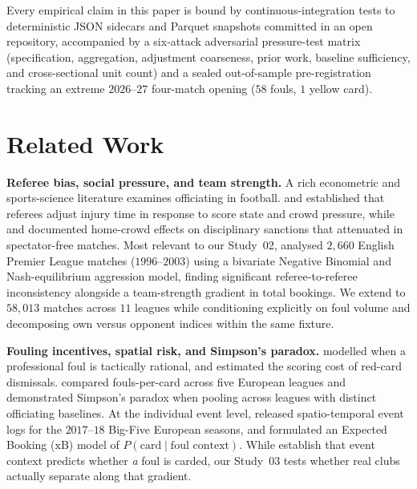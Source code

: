 \documentclass[10pt,twocolumn]{article}
\begin{document}
Every empirical claim in this paper is bound by continuous-integration tests to deterministic JSON sidecars and Parquet snapshots committed in an open repository, accompanied by a six-attack adversarial pressure-test matrix (specification, aggregation, adjustment coarseness, prior work, baseline sufficiency, and cross-sectional unit count) and a sealed out-of-sample pre-registration tracking an extreme $2026\text{--}27$ four-match opening ($58$ fouls, $1$ yellow card).

\section{Related Work}

\textbf{Referee bias, social pressure, and team strength.} A rich econometric and sports-science literature examines officiating in football. \citet{garicano2005favoritism} and \citet{dohmen2008social} established that referees adjust injury time in response to score state and crowd pressure, while \citet{boyko2007referee} and \citet{sors2021silence} documented home-crowd effects on disciplinary sanctions that attenuated in spectator-free matches. Most relevant to our Study~02, \citet{dawson2007referees} analysed $2,660$ English Premier League matches ($1996\text{--}2003$) using a bivariate Negative Binomial and Nash-equilibrium aggression model, finding significant referee-to-referee inconsistency alongside a team-strength gradient in total bookings. We extend \citet{dawson2007referees} to $58,013$ matches across $11$ leagues while conditioning explicitly on foul volume and decomposing own versus opponent indices within the same fixture.

\textbf{Fouling incentives, spatial risk, and Simpson's paradox.} \citet{wright2003professional} modelled when a professional foul is tactically rational, and \citet{ridder1994down} estimated the scoring cost of red-card dismissals. \citet{phatak2021dirty} compared fouls-per-card across five European leagues and demonstrated Simpson's paradox \citep{simpson1951interpretation} when pooling across leagues with distinct officiating baselines. At the individual event level, \citet{pappalardo2019events} released spatio-temporal event logs for the $2017\text{--}18$ Big-Five European seasons, and \citet{azmat2024xb} formulated an Expected Booking ($\text{xB}$) model of $P(\text{card}\mid\text{foul context})$. While \citet{azmat2024xb} establish that event context predicts whether \emph{a} foul is carded, our Study~03 tests whether real clubs actually separate along that gradient.
\end{document}
